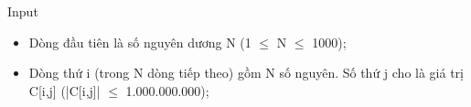 Input
\begin{itemize}
	\item     Dòng đầu tiên là số nguyên dương N (1  $\le$  N  $\le$  1000);   
	\item     Dòng thứ i (trong N dòng tiếp theo) gồm N số nguyên. Số thứ j cho là giá trị C[i,j] (|C[i,j]|  $\le$  1.000.000.000);   
\end{itemize}